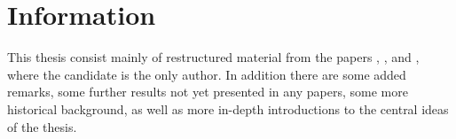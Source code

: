 
\section{Information}

This thesis consist mainly of restructured material from the papers \cite{aambo_2024_algebraicity}, \cite{aambo_2024_positselski}, \cite{aambo_2024_localizing} and \cite{aambo_2025_nerves}, where the candidate is the only author. In addition there are some added remarks, some further results not yet presented in any papers, some more historical background, as well as more in-depth introductions to the central ideas of the thesis. 